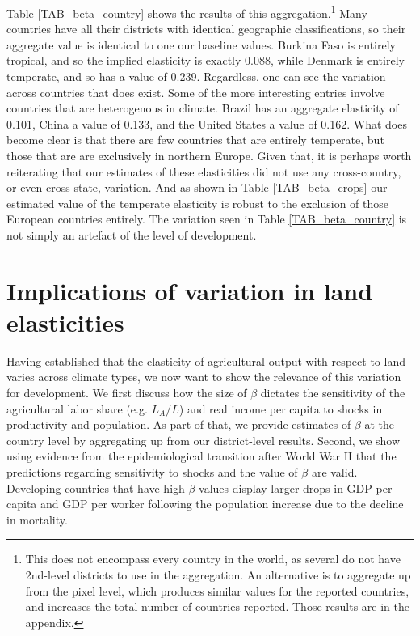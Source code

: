 \documentclass[11pt]{article}
\begin{document}
 Table \ref{TAB_beta_country} shows the results of this aggregation.\footnote{This does not encompass every country in the world, as several do not have 2nd-level districts to use in the aggregation. An alternative is to aggregate up from the pixel level, which produces similar values for the reported countries, and increases the total number of countries reported. Those results are in the appendix.} Many countries have all their districts with identical geographic classifications, so their aggregate value is identical to one our baseline values. Burkina Faso is entirely tropical, and so the implied elasticity is exactly 0.088, while Denmark is entirely temperate, and so has a value of 0.239. Regardless, one can see the variation across countries that does exist. Some of the more interesting entries involve countries that are heterogenous in climate. Brazil has an aggregate elasticity of 0.101, China a value of 0.133, and the United States a value of 0.162. What does become clear is that there are few countries that are entirely temperate, but those that are are exclusively in northern Europe. Given that, it is perhaps worth reiterating that our estimates of these elasticities did not use any cross-country, or even cross-state, variation. And as shown in Table \ref{TAB_beta_crops} our estimated value of the temperate elasticity is robust to the exclusion of those European countries entirely. The variation seen in Table \ref{TAB_beta_country} is not simply an artefact of the level of development.

\section{Implications of variation in land elasticities}\label{SEC_implications}
Having established that the elasticity of agricultural output with respect to land varies across climate types, we now want to show the relevance of this variation for development. We first discuss how the size of $\beta$ dictates the sensitivity of the agricultural labor share (e.g. $L_A/L$) and real income per capita to shocks in productivity and population. As part of that, we provide estimates of $\beta$ at the country level by aggregating up from our district-level results. Second, we show using evidence from the epidemiological transition after World War II that the predictions regarding sensitivity to shocks and the value of $\beta$ are valid. Developing countries that have high $\beta$ values display larger drops in GDP per capita and GDP per worker following the population increase due to the decline in mortality.
\end{document}
